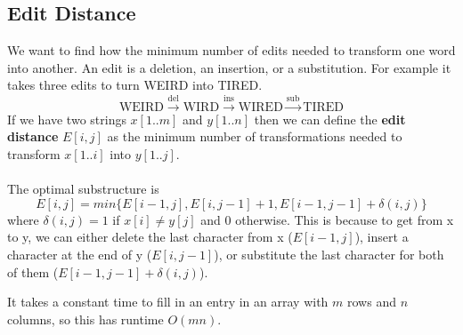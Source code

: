 \documentclass{article}
\begin{document}
    \subsection{Edit Distance}
        We want to find how the minimum number of edits needed to transform one word into another. An edit is a deletion, an insertion, or a substitution. For example it takes three edits to turn WEIRD into TIRED.
        \[ \text{WEIRD} \xrightarrow{\text{del}} \text{WIRD} \xrightarrow{\text{ins}} \text{WIRED} \xrightarrow{\text{sub}} \text{TIRED}\]
        If we have two strings $x[1..m]$ and $y[1..n]$ then we can define the \textbf{edit distance} $E[i,j]$ as the minimum number of transformations needed to transform $x[1..i]$ into $y[1..j]$. \\ \\
        The optimal substructure is 
        \[ E[i, j] = min\{ E[i - 1,j], E[i, j-1] + 1, E[i-1,j-1] + \delta(i,j) \} \]
        where $\delta(i,j) = 1$ if $x[i] \neq y[j]$ and $0$ otherwise. This is because to get from x to y, we can either delete the last character from x ($E[i - 1,j]$), insert a character at the end of y ($E[i, j-1]$), or substitute the last character for both of them ($E[i-1,j-1] + \delta(i,j)$).
        \begin{algorithmic}[1]
            \EndFor
            \EndFor
                \EndFor
            \EndFor
        \end{algorithmic}
        It takes a constant time to fill in an entry in an array with $m$ rows and $n$ columns, so this has runtime $O(mn)$.
\end{document}
